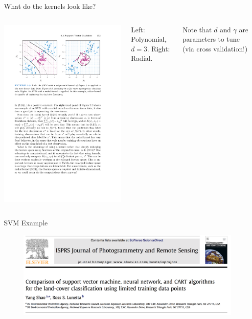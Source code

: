 \documentclass[mathserif, aspectratio=169]{beamer}
\begin{document}
\begin{frame}{What do the kernels look like?}
\begin{columns}

\includegraphics[scale=0.8]{SVM_kernels}


Left: Polynomial, $d=3$.  Right: Radial.

\vspace{5mm}
Note that $d$ and $\gamma$ are parameters to tune (via cross validation!)
\end{columns}
\end{frame}

\begin{frame}{SVM Example}

\begin{figure}
\includegraphics[width=\textwidth]{shao_JPRS}
\caption*{}
\end{figure}
\end{frame}
\end{document}
